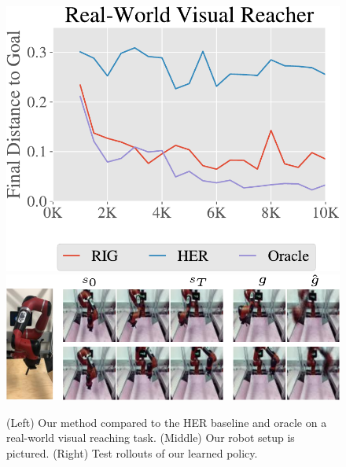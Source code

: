 \begin{figure}
    \centering
    \includegraphics[width=0.285\linewidth]{rig/img/real_reacher.pdf}
    \includegraphics[width=0.6\linewidth]{rig/img/real_rollouts-crop.pdf}
    \caption{(Left) Our method compared to the HER baseline and oracle on a real-world visual reaching task. (Middle) Our robot setup is pictured. (Right) Test rollouts of our learned policy. }
    \vspace{-0.2in}
    \label{fig:realworld-robot-results}
\end{figure}

